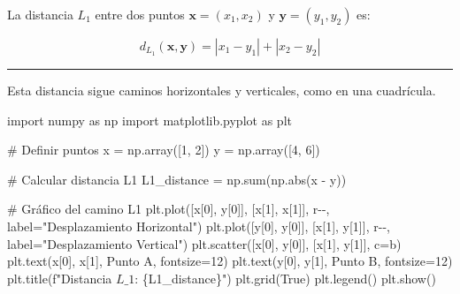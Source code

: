 \documentclass[
  letterpaper,
  DIV=11,
  numbers=noendperiod]{scrartcl}
\newenvironment{Shaded}{\begin{snugshade}}{\end{snugshade}}
\newcommand{\BuiltInTok}[1]{\textcolor[rgb]{0.00,0.23,0.31}{#1}}
\newcommand{\CommentTok}[1]{\textcolor[rgb]{0.37,0.37,0.37}{#1}}
\newcommand{\DecValTok}[1]{\textcolor[rgb]{0.68,0.00,0.00}{#1}}
\newcommand{\ImportTok}[1]{\textcolor[rgb]{0.00,0.46,0.62}{#1}}
\newcommand{\NormalTok}[1]{\textcolor[rgb]{0.00,0.23,0.31}{#1}}
\newcommand{\OperatorTok}[1]{\textcolor[rgb]{0.37,0.37,0.37}{#1}}
\newcommand{\SpecialCharTok}[1]{\textcolor[rgb]{0.37,0.37,0.37}{#1}}
\newcommand{\SpecialStringTok}[1]{\textcolor[rgb]{0.13,0.47,0.30}{#1}}
\newcommand{\StringTok}[1]{\textcolor[rgb]{0.13,0.47,0.30}{#1}}
\newcommand{\VariableTok}[1]{\textcolor[rgb]{0.07,0.07,0.07}{#1}}
\begin{document}
La distancia \(L_1\) entre dos puntos \(\mathbf{x} = (x_1, x_2)\) y
\(\mathbf{y} = (y_1, y_2)\) es:

\[
d_{L_1}(\mathbf{x}, \mathbf{y}) = |x_1 - y_1| + |x_2 - y_2|
\]

\begin{center}\rule{0.5\linewidth}{0.5pt}\end{center}

Esta distancia sigue caminos horizontales y verticales, como en una
cuadrícula.

\begin{Shaded}
\begin{Highlighting}[]
\ImportTok{import}\NormalTok{ numpy }\ImportTok{as}\NormalTok{ np}
\ImportTok{import}\NormalTok{ matplotlib.pyplot }\ImportTok{as}\NormalTok{ plt}

\CommentTok{\# Definir puntos}
\NormalTok{x }\OperatorTok{=}\NormalTok{ np.array([}\DecValTok{1}\NormalTok{, }\DecValTok{2}\NormalTok{])}
\NormalTok{y }\OperatorTok{=}\NormalTok{ np.array([}\DecValTok{4}\NormalTok{, }\DecValTok{6}\NormalTok{])}

\CommentTok{\# Calcular distancia L1}
\NormalTok{L1\_distance }\OperatorTok{=}\NormalTok{ np.}\BuiltInTok{sum}\NormalTok{(np.}\BuiltInTok{abs}\NormalTok{(x }\OperatorTok{{-}}\NormalTok{ y))}

\CommentTok{\# Gráfico del camino L1}
\NormalTok{plt.plot([x[}\DecValTok{0}\NormalTok{], y[}\DecValTok{0}\NormalTok{]], [x[}\DecValTok{1}\NormalTok{], x[}\DecValTok{1}\NormalTok{]], }\StringTok{\textquotesingle{}r{-}{-}\textquotesingle{}}\NormalTok{, label}\OperatorTok{=}\StringTok{"Desplazamiento Horizontal"}\NormalTok{)}
\NormalTok{plt.plot([y[}\DecValTok{0}\NormalTok{], y[}\DecValTok{0}\NormalTok{]], [x[}\DecValTok{1}\NormalTok{], y[}\DecValTok{1}\NormalTok{]], }\StringTok{\textquotesingle{}r{-}{-}\textquotesingle{}}\NormalTok{, label}\OperatorTok{=}\StringTok{"Desplazamiento Vertical"}\NormalTok{)}
\NormalTok{plt.scatter([x[}\DecValTok{0}\NormalTok{], y[}\DecValTok{0}\NormalTok{]], [x[}\DecValTok{1}\NormalTok{], y[}\DecValTok{1}\NormalTok{]], c}\OperatorTok{=}\StringTok{\textquotesingle{}b\textquotesingle{}}\NormalTok{)}
\NormalTok{plt.text(x[}\DecValTok{0}\NormalTok{], x[}\DecValTok{1}\NormalTok{], }\StringTok{\textquotesingle{}Punto A\textquotesingle{}}\NormalTok{, fontsize}\OperatorTok{=}\DecValTok{12}\NormalTok{)}
\NormalTok{plt.text(y[}\DecValTok{0}\NormalTok{], y[}\DecValTok{1}\NormalTok{], }\StringTok{\textquotesingle{}Punto B\textquotesingle{}}\NormalTok{, fontsize}\OperatorTok{=}\DecValTok{12}\NormalTok{)}
\NormalTok{plt.title(}\SpecialStringTok{f"Distancia $L\_1$: }\SpecialCharTok{\{}\NormalTok{L1\_distance}\SpecialCharTok{\}}\SpecialStringTok{"}\NormalTok{)}
\NormalTok{plt.grid(}\VariableTok{True}\NormalTok{)}
\NormalTok{plt.legend()}
\NormalTok{plt.show()}
\end{Highlighting}
\end{Shaded}
\end{document}
